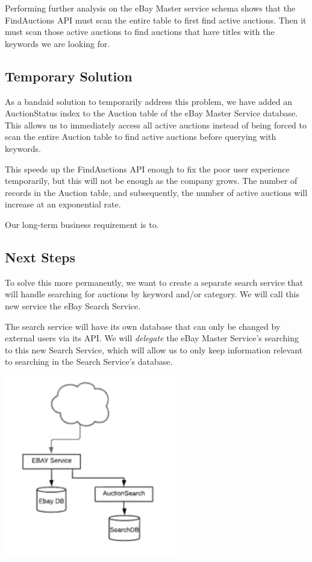 \documentclass[12pt,a4paper]{article}
\begin{document}
\vspace{\baselineskip}

Performing further analysis on the eBay Master service schema shows that the
FindAuctions API must scan the entire table to first find active auctions. Then
it must scan those active auctions to find auctions that have titles with the
keywords we are looking for.

\subsection{Temporary Solution}

As a bandaid solution to temporarily address this problem, we have added an 
AuctionStatus index to the Auction table of the eBay Master Service database.
This allows us to immediately access all active auctions instead of being forced 
to scan the entire Auction table to find active auctions before querying with keywords. 

\vspace{\baselineskip}
This speeds up the FindAuctions API enough to fix the poor user experience
temporarily, but this will not be enough as the company grows. The number of
records in the Auction table, and subsequently, the number of active auctions
will increase at an exponential rate.

\vspace{\baselineskip}

Our long-term business requirement is to.


\pagebreak
\subsection{Next Steps}
To solve this more permanently, we want to create a separate search service
that will handle searching for auctions by keyword and/or category. 
We will call this new service the eBay Search Service. 

\vspace{\baselineskip} 
The search service will have its own database that can only be changed
by external users via its API.
We will \emph{delegate} the eBay Master Service's searching to this new Search Service, 
which will allow us to only keep information relevant to searching in the Search Service's database. 

\begin{center}
    \includegraphics[scale=0.75]{images/new-service.png}
\end{center}
\end{document}
